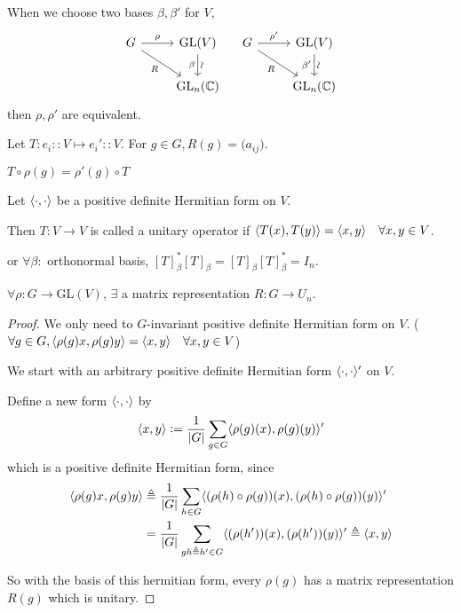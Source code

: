 \begin{remark}
  When we choose two bases $\beta, \beta'$ for $V$,
  \[
    \begin{tikzcd}
      G \arrow{r}{\rho} \arrow[swap]{dr}{R} & \text{GL}(V) \arrow[d, "\beta"', "\rotatebox{90}{\(\sim\)}"] \\
                                            & \text{GL}_n(\Cb)
    \end{tikzcd} \quad
    \begin{tikzcd}
      G \arrow{r}{\rho'} \arrow[swap]{dr}{R} & \text{GL}(V) \arrow[d, "\beta'"', "\rotatebox{90}{\(\sim\)}"] \\
                                            & \text{GL}_n(\Cb)
    \end{tikzcd}
  \]
  then $\rho, \rho'$ are equivalent.
\end{remark}

Let $T: e_i :: V \mapsto e_i' :: V$. For $g \in G, R(g) = \big(a_{ij}\big)$.

$T \circ \rho(g) = \rho'(g) \circ T$

\begin{definition}
  Let $\langle\cdot, \cdot\rangle$ be a positive definite Hermitian form on $V$.

  Then $T: V \to V$ is called a unitary operator if
  $\langle T(x), T(y)\rangle = \langle x, y\rangle \quad \forall x, y \in V$.

  or $\forall \beta:$ orthonormal basis,
  $[T]_\beta^*[T]_\beta = [T]_\beta[T]_\beta^* = I_n$.
\end{definition}

\begin{theorem}
  $\forall \rho: G \to \text{GL}(V)$, $\exists$ a matrix representation
  $R: G \to U_n$.
  \begin{proof}
    We only need to $G$-invariant positive definite Hermitian form on $V$.
    ($\forall g \in G, \langle\rho(g)x, \rho(g)y\rangle = \langle x, y\rangle \quad
  \forall x, y \in V$)

  We start with an arbitrary positive definite Hermitian form
  $\langle\cdot, \cdot\rangle'$ on $V$.

  Define a new form $\langle\cdot, \cdot\rangle$ by
  \[
    \langle x, y\rangle \vcentcolon= \frac{1}{\lvert G\rvert} \sum_{g\in G}
    \langle\rho(g)(x), \rho(g)(y)\rangle'
  \]
  which is a positive definite Hermitian form, since
  \begin{align*}
    \langle\rho(g)x, \rho(g)y\rangle
    & \triangleq
    \frac{1}{\lvert G\rvert} \sum_{h \in G} \langle(\rho(h) \circ \rho(g))(x),
      (\rho(h) \circ \rho(g))(y)\rangle' \\
    & =
    \frac{1}{\lvert G\rvert} \sum_{gh \triangleq h' \in G} \langle(\rho(h'))(x),
      (\rho(h'))(y)\rangle' \triangleq \langle x, y\rangle
  \end{align*}

  So with the basis of this hermitian form, every $\rho(g)$ has a matrix representation
  $R(g)$ which is unitary.
  \end{proof}
\end{theorem}

